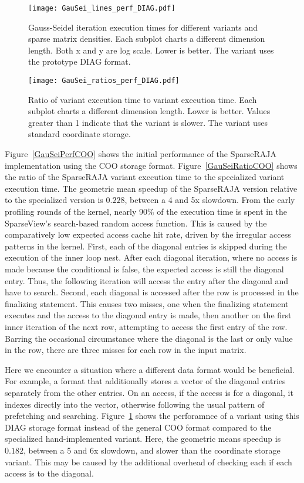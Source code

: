\begin{figure}
\texttt{[image: GauSei\_lines\_perf\_DIAG.pdf]}
\caption{Gauss-Seidel iteration execution times for different variants and sparse matrix densities. Each subplot charts a different dimension length. Both x and y are log scale. Lower is better. The \sparseraja{} variant uses the prototype DIAG format.}\label{GauSeiPerfDIAG}
\end{figure}
\begin{figure}
\texttt{[image: GauSei\_ratios\_perf\_DIAG.pdf]}
\caption{Ratio of \sparseraja{} variant execution time to \specialized{} variant execution time. Each subplot charts a different dimension length. Lower is better. Values greater than 1 indicate that the \sparseraja{} variant is slower. The \sparseraja{} variant uses standard coordinate storage.}\label{GauSeiRatioDIAG}
\end{figure}
Figure~\ref{GauSeiPerfCOO} shows the initial performance of the SparseRAJA implementation using the COO storage format.
Figure~\ref{GauSeiRatioCOO} shows the ratio of the SparseRAJA variant execution time to the specialized variant execution time.
The geometric mean speedup of the SparseRAJA version relative to the specialized version is $0.228$, between a 4 and 5x slowdown. 
From the early profiling rounds of the \GauSei{} kernel, nearly 90\% of the execution time is spent in the SparseView's search-based random access function.
This is caused by the comparatively low expected access cache hit rate, driven by the irregular access patterns in the kernel.
First, each of the diagonal entries is skipped during the execution of the inner loop nest.
After each diagonal iteration, where no access is made because the conditional is false, the expected access is still the diagonal entry. 
Thus, the following iteration will access the entry after the diagonal and have to search.
Second, each diagonal is accessed after the row is processed in the finalizing statement.
This causes two misses, one when the finalizing statement executes and the access to the diagonal entry is made, then another on the first inner iteration of the next row, attempting to access the first entry of the row.
Barring the occasional circumstance where the diagonal is the last or only value in the row, there are three misses for each row in the input matrix.

Here we encounter a situation where a different data format would be beneficial.
For example, a format that additionally stores a vector of the diagonal entries separately from the other entries.
On an access, if the access is for a diagonal, it indexes directly into the vector, otherwise following the usual pattern of prefetching and searching.
Figure~\ref{GauSeiPerfDIAG} shows the perforamnce of a variant using this DIAG storage format instead of the general COO format compared to the specialized hand-implemented variant.
Here, the geometric means speedup is $0.182$, between a 5 and 6x slowdown, and slower than the coordinate storage variant. 
This may be caused by the additional overhead of checking each if each access is to the diagonal.


